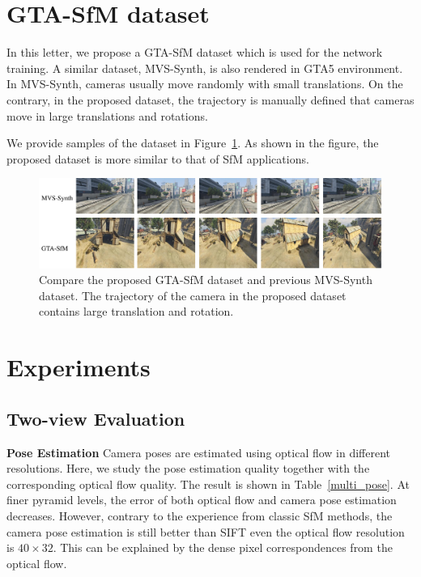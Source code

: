 \documentclass[letterpaper, 10 pt, conference]{ieeeconf}  %
\begin{document}
\section{GTA-SfM dataset}
 
In this letter, we propose a GTA-SfM dataset which is used for the network training. A similar dataset, MVS-Synth, is also rendered in GTA5 environment. In MVS-Synth, cameras usually move randomly with small translations. On the contrary, in the proposed dataset, the trajectory is manually defined that cameras move in large translations and rotations.
 
We provide samples of the dataset in Figure~\ref{fig:dataset_compare}. As shown in the figure, the proposed dataset is more similar to that of SfM applications.
 
\begin{figure}[h]
\vspace{0.5cm}
\begin{center}
\includegraphics[width=1.0\linewidth]{figs/dataset_compare.pdf}
\end{center}
\vspace{-0.5cm}
\caption{Compare the proposed GTA-SfM dataset and previous MVS-Synth dataset. The trajectory of the camera in the proposed dataset contains large translation and rotation.}
\label{fig:dataset_compare}
\end{figure}
 
\section{Experiments}
 
\subsection{Two-view Evaluation}
 
\textbf{Pose Estimation} Camera poses are estimated using optical flow in different resolutions. Here, we study the pose estimation quality together with the corresponding optical flow quality. The result is shown in Table~\ref{multi_pose}. At finer pyramid levels, the error of both optical flow and camera pose estimation decreases. However, contrary to the experience from classic SfM methods, the camera pose estimation is still better than SIFT even the optical flow resolution is $40\times32$. This can be explained by the dense pixel correspondences from the optical flow. 
 
\end{document}
